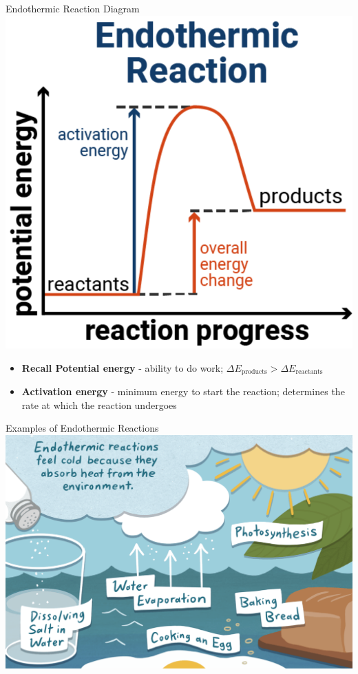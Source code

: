 \documentclass[11pt]{beamer}
\begin{document}
\begin{frame}{Endothermic Reaction Diagram}
  \centering
  \includegraphics[width=0.5\linewidth]{endo_rxn}

  \begin{itemize}
  \item \textbf{Recall Potential energy} - ability to do
    work; $\Delta E_\text{products} > \Delta E_\text{reactants}$
  \item \textbf{Activation energy} - minimum energy to start the
    reaction; determines the rate at which the reaction undergoes
  \end{itemize}
\end{frame}

\begin{frame}{Examples of Endothermic Reactions}
  \centering
  \includegraphics[width=\linewidth]{endo_everyday}
\end{frame}
\end{document}
